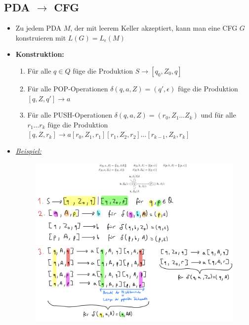\documentclass[ieeetran]{article}
\begin{document}
\subsection{PDA $\rightarrow$ CFG} %
\label{sub:pDA_rightarrow_cFG}
\begin{itemize}
	\item Zu jedem PDA $M$, der mit leerem Keller akzeptiert, kann man eine CFG $G$ konstruieren mit $L(G) = L_{\epsilon}(M)$
\item \textbf{Konstruktion:}
	\begin{enumerate}
		\item Für alle $q \in Q$ füge die Produktion $S \rightarrow [q_0, Z_0, q]$
		\item Für alle POP-Operationen $\delta(q, a, Z) = (q', \epsilon)$ füge die Produktion $[q,Z,q'] \rightarrow a$
		\item Für alle PUSH-Operationen $\delta(q, a, Z) = (r_0, Z_1 \ldots Z_k)$ und für alle $r_1 \ldots r_k$ füge die Produktion $[q, Z, r_k] \rightarrow a[r_0, Z_1, r_1][r_1, Z_2, r_2] \ldots [r_{k-1}, Z_k, r_k]$
	\end{enumerate}

\item \textit{\underline{Beispiel:}}
	\begin{figure}[h!]
	  \centering
	  \includegraphics[width=0.65\linewidth]{pdatocfg}
	  \label{fig:pdatocfg}
	\end{figure}
\end{itemize}
\end{document}

